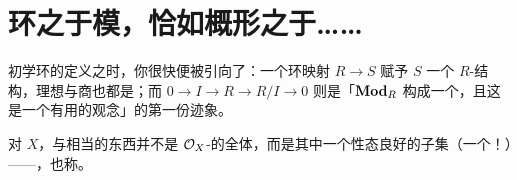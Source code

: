 
\chapter{环之于模，恰如概形之于……}
\label{ch:rings-modules-schemes}

初学环的定义之时，你很快便被引向了\trModule{}：一个环映射 $R\to S$ 赋予 $S$ 一个 $R$-\trModule{}结构，理想与商也都是\trModule{}；而\trShortExactSequence{} $0\to I\to R\to R/I\to 0$ 则是「$\mathbf{Mod}_{R}$ 构成一个\trAbelianCategory，且这是一个有用的观念」的第一份迹象。

对\trScheme{} $X$，与\trModule{}相当的东西并不是 $\mathcal{O}_X$-\trModule{}的全体，而是其中一个性态良好的子集（一个\trSubcategory{}！）——\trQCSheaf{}，也称\trQCSheaf。








